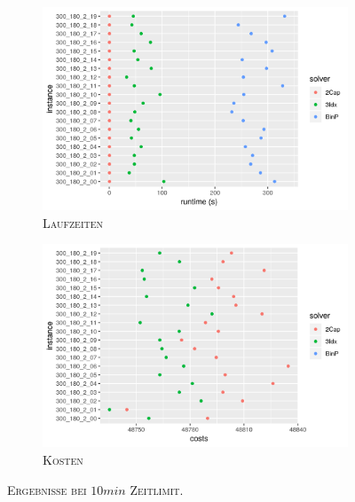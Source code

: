 \begin{figure}[H]
\centering
\begin{subfigure}[b]{0.4\textwidth}
\centering
\includegraphics[width=1.3\textwidth]{img/solver_instance_time_b=2_m_600s.png}
\caption{\textsc{Laufzeiten}}
\label{fig:b=2_m_runtimes}
\end{subfigure}
\hfill
\begin{subfigure}[b]{0.4\textwidth}
\centering
\includegraphics[width=1.3\textwidth]{img/solver_instance_cost_b=2_m_600s.png}
\caption{\textsc{Kosten}}
\label{fig:b=2_m_costs}
\end{subfigure}
\caption{\textsc{Ergebnisse bei $10min$ Zeitlimit}.}
\label{fig:res_plots_b=2_m}
\end{figure}

